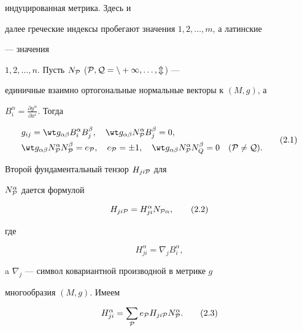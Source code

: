 индуцированная метрика. Здесь и


далее греческие индексы пробегают значения $1,2,\dotsc,m$, а латинские


--- значения


$1,2,\dotsc,n$. Пусть $N_{\cal P}$ ($\cal P,Q=n+1,\dotsc,m$) ---


единичные взаимно ортогональные нормальные векторы к $(M,g)$, а


$B^\alpha_i=\frac{\partial y^\alpha}{\partial x^i}$. Тогда


\begin{equation}


\begin{split}


& g_{ij}=\wt g_{\alpha\beta}B^\alpha_i B^\beta_j,\quad


\wt g_{\alpha\beta}N^\alpha_{\cal P}B^\beta_j=0, \\


& \wt g_{\alpha\beta}N^\alpha_{\cal P}N^\beta_{\cal P}


=e_{\cal P},\quad e_{\cal P}=\pm 1,\quad


\wt g_{\alpha\beta}N^\alpha_{\cal P}N^\beta_Q=0


\quad (\cal P\ne Q).


\end{split}


\tag{2.1}


\end{equation}


Второй фундаментальный тензор $H_{ji\cal P}$ для


$N^\alpha_{\cal P}$ дается формулой


\begin{equation}


H_{ji\cal P}=H^\alpha_{ji}N_{\cal P\alpha},\tag{2.2}


\end{equation}


где


$$


H^\alpha_{ji}=\nabla_j B^\alpha_i,


$$


a $\nabla_j$ --- символ ковариантной производной в метрике $g$


многообразия $(M,g)$. Имеем


\begin{equation}


H^\alpha_{ji}=\sum_{\cal P}e_{\cal P}H_{ji\cal P}


N^\alpha_{\cal P}.\tag{2.3}


\end{equation}





